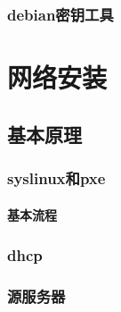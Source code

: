 \documentclass[a4paper,10pt]{article}
\begin{document}
\begin{CJK}{UTF8}{gbsn}
\subsubsection{}
\section{debian密钥工具}
\subsection{}
\subsubsection{}

\part{网络安装}
\chapter{基本原理}
\section{syslinux和pxe}
\subsection{基本流程}
\subsubsection{}
\section{dhcp}
\subsection{}
\subsubsection{}
\section{源服务器}
\subsection{}
\subsubsection{}

\end{CJK}
\end{document}
